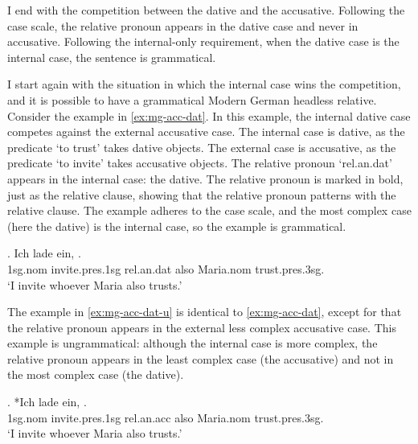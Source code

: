 I end with the competition between the dative and the accusative. Following the case scale, the relative pronoun appears in the dative case and never in accusative. Following the internal-only requirement, when the dative case is the internal case, the sentence is grammatical.

I start again with the situation in which the internal case wins the competition, and it is possible to have a grammatical Modern German headless relative.
Consider the example in \ref{ex:mg-acc-dat}. In this example, the internal dative case competes against the external accusative case.
The internal case is dative, as the predicate  `to trust' takes dative objects.
The external case is accusative, as the predicate  `to invite' takes accusative objects.
The relative pronoun  `\ac{rel}.\ac{an}.\ac{dat}' appears in the internal case: the dative. The relative pronoun is marked in bold, just as the relative clause, showing that the relative pronoun patterns with the relative clause.
The example adheres to the case scale, and the most complex case (here the dative) is the internal case, so the example is grammatical.

\exg. Ich {lade ein},    . \\
1\ac{sg}.\ac{nom} invite.\ac{pres}.1\ac{sg}\scsub{[acc]} \ac{rel}.\ac{an}.\ac{dat} also Maria.\ac{nom} trust.\ac{pres}.3\ac{sg}\scsub{[dat]}.\\
`I invite whoever Maria also trusts.' \label{ex:mg-acc-dat}

The example in \ref{ex:mg-acc-dat-u} is identical to \ref{ex:mg-acc-dat}, except for that the relative pronoun appears in the external less complex accusative case. This example is ungrammatical: although the internal case is more complex, the relative pronoun appears in the least complex case (the accusative) and not in the most complex case (the dative).

\exg. *Ich {lade ein},    . \\
1\ac{sg}.\ac{nom} invite.\ac{pres}.1\ac{sg}\scsub{[acc]} \ac{rel}.\ac{an}.\ac{acc} also Maria.\ac{nom} trust.\ac{pres}.3\ac{sg}\scsub{[dat]}.\\
`I invite whoever Maria also trusts.' \label{ex:mg-acc-dat-u}


